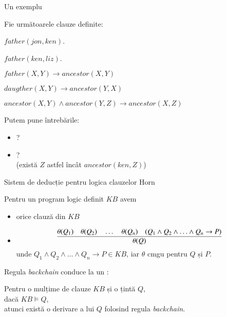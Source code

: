 \documentclass[xcolor=pdftex,romanian,colorlinks]{beamer}
\begin{document}
\begin{frame}{Un exemplu}

Fie următoarele clauze definite:

\hspace{.4cm} $father(jon,ken)$.

\hspace{.4cm} $father(ken,liz)$.

\hspace{.4cm} $father(X,Y) \to ancestor(X,Y)$

\hspace{.4cm} $daugther(X,Y) \to ancestor(Y,X)$ 

\hspace{.4cm} $ancestor(X,Y) \wedge ancestor(Y,Z) \to ancestor(X,Z)$

\medskip
Putem pune întrebările:
\begin{itemize}
	\item {}?
	\item {}? \\(există $Z$ astfel încât $ancestor(ken,Z)$) 
\end{itemize}

\end{frame}

\begin{frame}{Sistem de deducție pentru logica clauzelor Horn}


Pentru un program logic definit $KB$  avem
\begin{itemize}
	 
	\item {} orice clauză din $KB$ 
	 
	\item {}
	\[
	\infer{\theta(Q)}{\theta(Q_1)\quad \theta(Q_2) \quad \ldots \quad \theta(Q_n) \quad (Q_1 \wedge Q_2 \wedge \ldots \wedge Q_n \to P)}
	\]
	unde $Q_1 \wedge Q_2 \wedge \ldots \wedge Q_n \to P \in KB$, iar $\theta$ cmgu pentru $Q$ și $P$.
\end{itemize}

\vspace{.4cm}
Regula \textit{backchain} conduce la un :
\begin{center}
	
	Pentru o mulțime de clauze $KB$ și o țintă $Q$, \\
	dacă $KB \models Q$, \\
	atunci există o derivare a lui $Q$ folosind regula \textit{backchain}.
\end{center} 
\end{frame}
\end{document}
